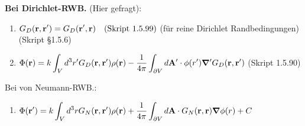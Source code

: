 \documentclass{scrartcl}
\newcommand{\ds}{\displaystyle}
\newcommand{\smref}[1]{\quad\text{(Skript #1)}}
\begin{document}
\begin{enumerate}
          \textbf{Bei Dirichlet-RWB.} (Hier gefragt):
          \begin{center}
          \begin{enumerate}
            \item $\ds G_D(\vb r, \vb r')= G_D(\vb r', \vb r)
              \smref{1.5.99}$ 
            (für reine Dirichlet Randbedingungen) (Skript §1.5.6)\\
          \item $\ds \Phi(\vb r)=k\int_V d^3r' G_D(\vb r, \vb r')\rho(\vb r)
             -\frac{1}{4\pi}\int_{\partial V}d\vb A'\cdot\phi(r')
             \grad' G_D(\vb r, \vb r')$ (Skript 1.5.90)\\
          \end{enumerate}
          \end{center}
          Bei von Neumann-RWB.:
          \begin{enumerate}
            \item $\ds \Phi(\vb r')=
              k\int_V d^3r G_N(\vb r,\vb r')\rho(\vb r)
              +\frac{1}{4\pi} \int_{\partial V} d\vb A \cdot 
              G_N(\vb r,\vb r)\grad\phi(r) + C$
          \end{enumerate}
  \end{enumerate}
  \newpage
\end{document}
